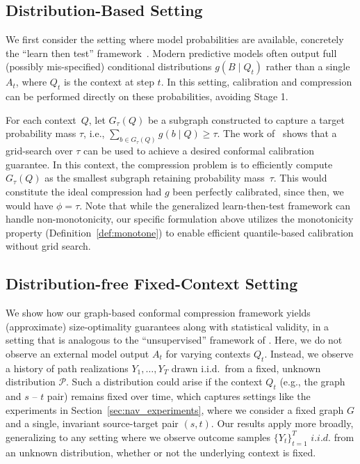 \subsection{Distribution-Based Setting}
\label{sec:distr2}
We first consider the setting where model probabilities are available, concretely the ``learn then test'' framework~\cite{angelopoulos2022learntestcalibratingpredictive}. Modern predictive models often output full (possibly mis-specified) conditional distributions $g(B\mid Q_t)$ rather than a single $A_t$, where $Q_t$ is the context at step $t$. In this setting, calibration and compression can be performed directly on these probabilities, avoiding Stage 1.  

For each context~$Q$, let $G_\tau(Q)$ be a subgraph constructed to capture a target probability mass $\tau$, i.e., $\sum_{b\in G_\tau(Q)} g(b\mid Q) \ge \tau$. The work of~\cite{angelopoulos2022learntestcalibratingpredictive} shows that a grid-search over $\tau$ can be used to achieve a desired conformal calibration guarantee. In this context, the compression problem is to efficiently compute $G_\tau(Q)$ as the smallest subgraph retaining probability mass~$\tau$. This would constitute the ideal compression had $g$ been perfectly calibrated, since then, we would have $\phi = \tau$. Note that while the generalized learn-then-test framework can handle non-monotonicity, our specific formulation above utilizes the monotonicity property (Definition~\ref{def:monotone}) to enable efficient quantile-based calibration without grid search. 

\subsection{Distribution-free Fixed-Context Setting}
\label{sec:fixed}
We show how our graph-based conformal compression framework yields (approximate) size-optimality guarantees along with statistical validity, in a  setting that is analogous to the ``unsupervised'' framework of \cite{gao2025volume}. Here, we do not observe an external model output $A_t$ for varying contexts $Q_t$. Instead, we observe a history of path realizations $Y_1, \dots, Y_T$ drawn i.i.d.\ from a fixed, unknown distribution $\mathcal{P}$.  Such a distribution could arise if the context $Q_t$ (e.g., the 
graph and $s$ -- $t$ pair) remains fixed over time, which captures settings like the experiments in Section~\ref{sec:nav_experiments}, where we consider a fixed graph $G$ and a single, invariant source-target pair $(s, t)$. Our results apply more broadly, generalizing to any  setting where we observe outcome samples $\{Y_t\}_{t=1}^T$ $i.i.d.$ from an unknown distribution, whether or not the underlying context is fixed.


